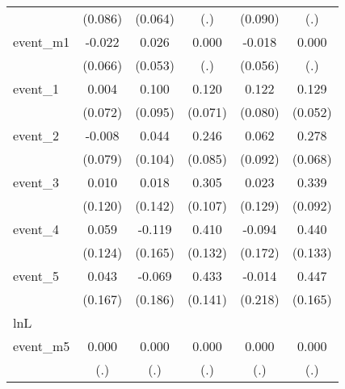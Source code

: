 {\begin{tabular}{l*{5}{c}}
            &     (0.086)         &     (0.064)         &         (.)         &     (0.090)         &         (.)         \\
[1em]
event\_m1    &      -0.022         &       0.026         &       0.000         &      -0.018         &       0.000         \\
            &     (0.066)         &     (0.053)         &         (.)         &     (0.056)         &         (.)         \\
[1em]
event\_1     &       0.004         &       0.100         &       0.120         &       0.122         &       0.129\sym{*}  \\
            &     (0.072)         &     (0.095)         &     (0.071)         &     (0.080)         &     (0.052)         \\
[1em]
event\_2     &      -0.008         &       0.044         &       0.246\sym{**} &       0.062         &       0.278\sym{***}\\
            &     (0.079)         &     (0.104)         &     (0.085)         &     (0.092)         &     (0.068)         \\
[1em]
event\_3     &       0.010         &       0.018         &       0.305\sym{**} &       0.023         &       0.339\sym{***}\\
            &     (0.120)         &     (0.142)         &     (0.107)         &     (0.129)         &     (0.092)         \\
[1em]
event\_4     &       0.059         &      -0.119         &       0.410\sym{**} &      -0.094         &       0.440\sym{***}\\
            &     (0.124)         &     (0.165)         &     (0.132)         &     (0.172)         &     (0.133)         \\
[1em]
event\_5     &       0.043         &      -0.069         &       0.433\sym{**} &      -0.014         &       0.447\sym{**} \\
            &     (0.167)         &     (0.186)         &     (0.141)         &     (0.218)         &     (0.165)         \\
\hline
lnL         &                     &                     &                     &                     &                     \\
event\_m5    &       0.000         &       0.000         &       0.000         &       0.000         &       0.000         \\
            &         (.)         &         (.)         &         (.)         &         (.)         &         (.)         \\

\end{tabular}}
